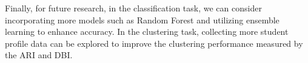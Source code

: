\documentclass[conference]{IEEEtran}
\begin{document}
Finally, for future research, in the classification task, we can consider incorporating more models such as Random Forest and utilizing ensemble learning to enhance accuracy. In the clustering task, collecting more student profile data can be explored to improve the clustering performance measured by the ARI and DBI.








































\end{document}
